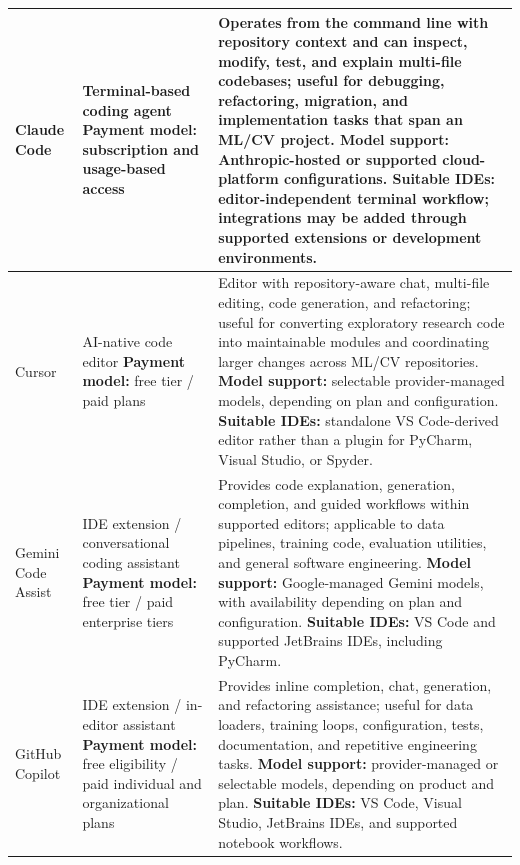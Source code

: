 \documentclass{article}
\newcounter{entry}[section]
\renewcommand{\theentry}{\thesection.\arabic{entry}}
\newcommand{\EntryRow}[5]{
    \noalign{
        \stepcounter{entry}
        \xdef\ENTRYNUM{\theentry}
        \phantomsection\label{entry:#1}
        \addcontentsline{toc}{subsubsection}{\ENTRYNUM\hspace{0.5cm}#2}
    }
    #2 #3 & #4 & #5 \\
    \hline
}
\begin{document}
\begin{longtable}{|p{}|p{}|p{}|}
    \EntryRow{claude_code}{Claude Code}{\cite{anthropic2026claudecode}}{Terminal-based coding agent \newline \textbf{Payment model:} subscription and usage-based access}{Operates from the command line with repository context and can inspect, modify, test, and explain multi-file codebases; useful for debugging, refactoring, migration, and implementation tasks that span an ML/CV project. \newline \textbf{Model support:} Anthropic-hosted or supported cloud-platform configurations. \newline \textbf{Suitable IDEs:} editor-independent terminal workflow; integrations may be added through supported extensions or development environments.}

    \EntryRow{cursor}{Cursor}{\cite{jiang2025beyond}}{AI-native code editor \newline \textbf{Payment model:} free tier / paid plans}{Editor with repository-aware chat, multi-file editing, code generation, and refactoring; useful for converting exploratory research code into maintainable modules and coordinating larger changes across ML/CV repositories. \newline \textbf{Model support:} selectable provider-managed models, depending on plan and configuration. \newline \textbf{Suitable IDEs:} standalone VS Code-derived editor rather than a plugin for PyCharm, Visual Studio, or Spyder.}

    \EntryRow{gemini_code_assist}{Gemini Code Assist}{\cite{google2026geminicodeassist}}{IDE extension / conversational coding assistant \newline \textbf{Payment model:} free tier / paid enterprise tiers}{Provides code explanation, generation, completion, and guided workflows within supported editors; applicable to data pipelines, training code, evaluation utilities, and general software engineering. \newline \textbf{Model support:} Google-managed Gemini models, with availability depending on plan and configuration. \newline \textbf{Suitable IDEs:} VS Code and supported JetBrains IDEs, including PyCharm.}

    \EntryRow{github_copilot}{GitHub Copilot}{\cite{zhang2023practices}}{IDE extension / in-editor assistant \newline \textbf{Payment model:} free eligibility / paid individual and organizational plans}{Provides inline completion, chat, generation, and refactoring assistance; useful for data loaders, training loops, configuration, tests, documentation, and repetitive engineering tasks. \newline \textbf{Model support:} provider-managed or selectable models, depending on product and plan. \newline \textbf{Suitable IDEs:} VS Code, Visual Studio, JetBrains IDEs, and supported notebook workflows.}


\end{longtable}
\end{document}
